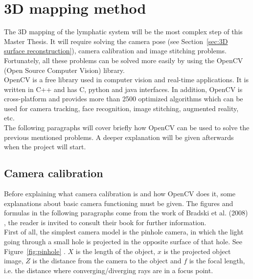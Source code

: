 \section{3D mapping method}
\label{sec:3D cartography method}

The 3D mapping of the lymphatic system will be the most complex step of this Master Thesis. It will require solving the camera pose (see Section~\ref{sec:3D surface reconstruction}), camera calibration and image stitching problems. Fortunately, all these problems can be solved more easily by using the OpenCV (Open Source Computer Vision) library. \\

OpenCV is a free library used in computer vision and real-time applications. It is written in C++ and has C, python and java interfaces. In addition, OpenCV is cross-platform and provides more than 2500 optimized algorithms \cite{opencv} which can be used for camera tracking, face recognition, image stitching, augmented reality, etc.  \\

The following paragraphs will cover briefly how OpenCV can be used to solve the previous mentioned problems. A deeper explanation will be given afterwards when the project will start. \\

\subsection{Camera calibration}
\label{sec:camera calibration}

Before explaining what camera calibration is and how OpenCV does it, some explanations about basic camera functioning must be given. The figures and formulas in the following paragraphs come from the work of Bradski et al. (2008) \cite{bradski_learning_2008}, the reader is invited to consult their book for further information.\\

First of all, the simplest camera model is the pinhole camera, in which the light going through a small hole is projected in the opposite surface of that hole. See Figure~\ref{fig:pinhole} \cite[p. 372]{bradski_learning_2008}. $X$ is the length of the object, $x$ is the projected object image, $Z$ is the distance from the camera to the object and $f$ is the focal length, i.e. the distance where converging/diverging rays are in a focus point.\\

